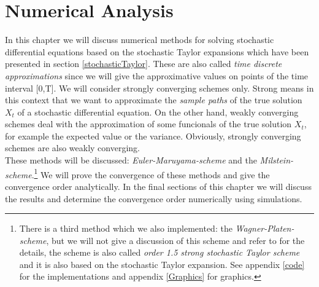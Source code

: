 \chapter{Numerical Analysis}
\label{ch:Num}
In this chapter we will discuss numerical methods for solving stochastic differential equations based on the stochastic Taylor expansions which have been presented in section \ref{stochasticTaylor}. These are also called \emph{time discrete approximations} since we will give the approximative values on points of the time interval [0,T]. We will consider strongly converging schemes only. Strong means in this context that we want to approximate the \emph{sample paths} of the true solution \(X_t\) of a stochastic differential equation. On the other hand, weakly converging schemes deal with the approximation of some funcionals of the true solution \(X_t\), for example the expected value or the variance. Obviously, strongly converging schemes are also weakly converging.\\
These methods will be discussed: \emph{Euler-Maruyama-scheme} and the \emph{Milstein-scheme}.\footnote{There is a third method which we also implemented: the \emph{Wagner-Platen-scheme}, but we will not give a discussion of this scheme and refer to \cite{KloedenPlaten} for the details, the scheme is also called \emph{order 1.5 strong stochastic Taylor scheme} and it is also based on the stochastic Taylor expansion. See appendix \ref{code} for the implementations and appendix \ref{Graphics} for graphics.}
We will prove the convergence of these methods and give the convergence order analytically. In the final sections of this chapter we will discuss the results and determine the convergence order numerically using simulations.



